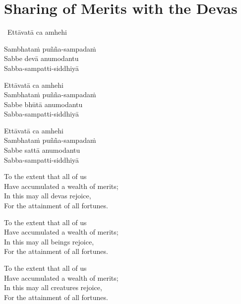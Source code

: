 \section{Sharing of Merits with the Devas}
\label{sharing-merits-devas}

\begin{leader-only}
  \anglebracketleft\ \hspace{-0.5mm}Ettāvatā ca amhehi \hspace{-0.5mm}\anglebracketright\
\end{leader-only}

\vspace{-0.99em}

Sambhataṁ puñña-sampadaṁ\\
Sabbe devā anumodantu\\
Sabba-sampatti-siddhiyā

Ettāvatā ca amhehi\\
Sambhataṁ puñña-sampadaṁ\\
Sabbe bhūtā anumodantu\\
Sabba-sampatti-siddhiyā

Ettāvatā ca amhehi\\
Sambhataṁ puñña-sampadaṁ\\
Sabbe sattā anumodantu\\
Sabba-sampatti-siddhiyā


\clearpage

\begin{english-verses}
  To the extent that all of us\\
  Have accumulated a wealth of merits;\\
  In this may all devas rejoice,\\
  For the attainment of all fortunes.
\end{english-verses}

\begin{english-verses}
  To the extent that all of us\\
  Have accumulated a wealth of merits;\\
  In this may all beings rejoice,\\
  For the attainment of all fortunes.
\end{english-verses}

\begin{english-verses}
  To the extent that all of us\\
  Have accumulated a wealth of merits;\\
  In this may all creatures rejoice,\\
  For the attainment of all fortunes.
\end{english-verses}

